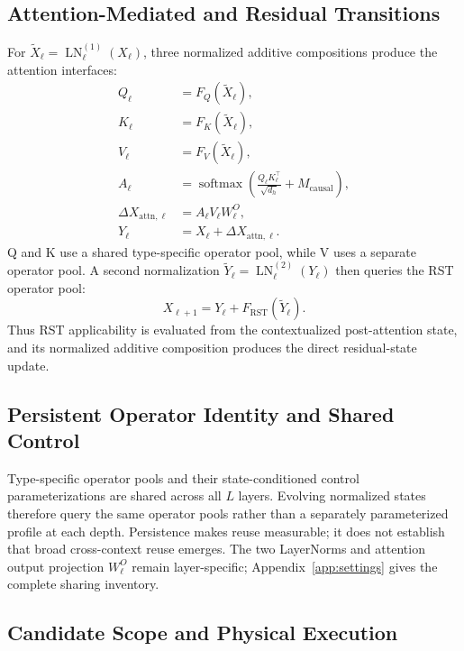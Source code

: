 \documentclass{article}
\begin{document}
\subsection{Attention-Mediated and Residual Transitions}
\label{sec:block}

For \(\widetilde X_\ell=\operatorname{LN}^{(1)}_\ell(X_\ell)\), three
normalized additive compositions produce the attention interfaces:
\begin{align}
Q_\ell&=F_Q(\widetilde X_\ell),\nonumber\\
K_\ell&=F_K(\widetilde X_\ell),\nonumber\\
V_\ell&=F_V(\widetilde X_\ell),\nonumber\\
A_\ell&=\operatorname{softmax}\!\left(
\frac{Q_\ell K_\ell^\top}{\sqrt{d_h}}+M_{\mathrm{causal}}\right)
\!,\nonumber\\
\Delta X_{\mathrm{attn},\ell}&=A_\ell V_\ell W^O_\ell,\\
Y_\ell&=X_\ell+\Delta X_{\mathrm{attn},\ell}.
\label{eq:attention}
\end{align}
Q and K use a shared type-specific operator pool, while V uses a separate
operator pool. A second
normalization \(\widetilde Y_\ell=\operatorname{LN}^{(2)}_\ell(Y_\ell)\) then
queries the RST operator pool:
\begin{equation}
X_{\ell+1}=Y_\ell+F_{\mathrm{RST}}(\widetilde Y_\ell).
\label{eq:rst}
\end{equation}
Thus RST applicability is evaluated from the contextualized post-attention
state, and its normalized additive composition produces the direct
residual-state update.

\subsection{Persistent Operator Identity and Shared Control}
\label{sec:reuse}

Type-specific operator pools and their state-conditioned control parameterizations
are shared across all \(L\) layers. Evolving normalized states therefore query
the same operator pools rather than a separately parameterized profile at each
depth. Persistence makes reuse measurable; it does not establish that broad
cross-context reuse emerges. The two
LayerNorms and attention output projection \(W^O_\ell\) remain layer-specific;
Appendix~\ref{app:settings} gives the complete sharing inventory.

\subsection{Candidate Scope and Physical Execution}
\label{sec:candidate-execution}
\end{document}
